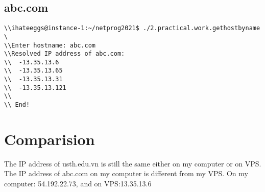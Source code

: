 \documentclass{article}
\begin{document}
\subsection{abc.com}
\begin{lstlisting}
\\ihateeggs@instance-1:~/netprog2021$ ./2.practical.work.gethostbyname \
\\Enter hostname: abc.com
\\Resolved IP address of abc.com:
\\	-13.35.13.6
\\ 	-13.35.13.65
\\ 	-13.35.13.31
\\ 	-13.35.13.121
\\ 
\\ End!

\end{lstlisting}

\section{Comparision}
The IP address of usth.edu.vn is still the same either on my computer or on VPS.
The IP address of abc.com on my computer is different from my VPS.
On my computer: 54.192.22.73, and on VPS:13.35.13.6
\end{document}
